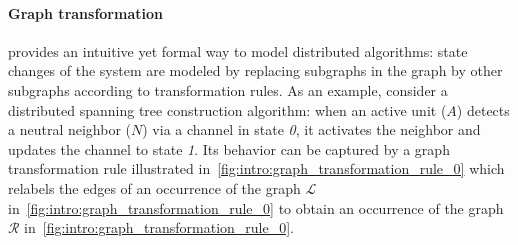 \paragraph{Graph transformation} provides an intuitive yet formal way to model distributed algorithms: state changes of the system are modeled by replacing subgraphs in the graph by other subgraphs according to transformation rules.
As an example, consider a distributed spanning tree construction algorithm: when an active unit ($A$) detects a neutral neighbor ($N$) via a channel in state \textit{0}, it activates the neighbor and updates the channel to state \textit{1}. Its behavior can be captured by a graph transformation rule illustrated in~\autoref{fig:intro:graph_transformation_rule_0}
which
relabels the edges of an occurrence of the graph $\mathcal{L}$ in~\autoref{fig:intro:graph_transformation_rule_0} to obtain an occurrence of the graph $\mathcal{R}$ in~\autoref{fig:intro:graph_transformation_rule_0}.

